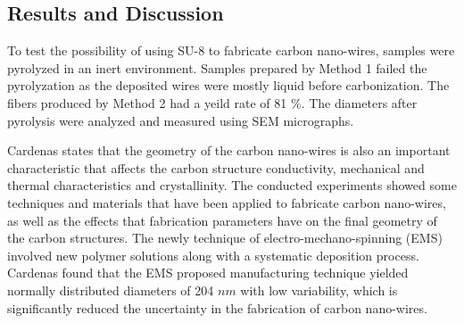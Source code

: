 \subsection{Results and Discussion}
To test the possibility of using SU-8 to fabricate carbon nano-wires, samples were pyrolyzed in an inert environment. Samples prepared by Method 1 failed the pyrolyzation as the deposited wires were mostly liquid before carbonization. The fibers produced by Method 2 had a yeild rate of 81 $\%$. The diameters after pyrolysis were analyzed and measured using SEM micrographs.

Cardenas \cite{Cardenas2017} states that the geometry of the carbon nano-wires is also an important characteristic that affects the carbon structure conductivity, mechanical and thermal characteristics and crystallinity. The conducted experiments showed some techniques and materials that have been applied to fabricate carbon nano-wires, as well as the effects that fabrication parameters have on the final geometry of the carbon structures. The newly technique of electro-mechano-spinning (EMS) involved new polymer solutions along with a systematic deposition process. Cardenas found that the EMS proposed manufacturing technique yielded normally distributed diameters of 204 $nm$ with low variability, which is significantly reduced the uncertainty in the fabrication of carbon nano-wires.



